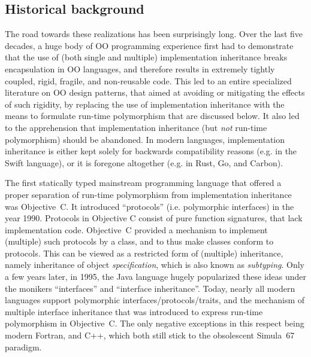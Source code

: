 \documentclass[11pt,oneside]{article}
\begin{document}
\subsection{Historical background}

The road towards these realizations has been surprisingly long. Over
the last five decades, a huge body of OO programming experience first
had to demonstrate that the use of (both single and multiple)
implementation inheritance breaks encapsulation in OO languages, and
therefore results in extremely tightly coupled, rigid, fragile, and
non-reusable code. This led to an entire specialized literature on OO
design patterns, that aimed at avoiding or mitigating the effects of
such rigidity, by replacing the use of implementation inheritance with
the means to formulate run-time polymorphism that are discussed
below. It also led to the apprehension that implementation inheritance
(but \emph{not} run-time polymorphism) should be abandoned. In modern
languages, implementation inheritance is either kept solely for
backwards compatibility reasons (e.g. in the Swift language), or it is
foregone altogether (e.g. in Rust, Go, and Carbon).

The first statically typed mainstream programming language that
offered a proper separation of run-time polymorphism from
implementation inheritance was Objective~C. It introduced
``protocols'' (i.e. polymorphic interfaces) in the year
1990. Protocols in Objective C consist of pure function signatures,
that lack implementation code. Objective~C provided a mechanism to
implement (multiple) such protocols by a class, and to thus make
classes conform to protocols. This can be viewed as a restricted form
of (multiple) inheritance, namely inheritance of object
\emph{specification}, which is also known as \emph{subtyping}. Only a
few years later, in 1995, the Java language hugely popularized these
ideas under the monikers ``interfaces'' and ``interface
inheritance''. Today, nearly all modern languages support polymorphic
interfaces/protocols/traits, and the mechanism of multiple interface
inheritance that was introduced to express run-time polymorphism in
Objective~C. The only negative exceptions in this respect being modern
Fortran, and C++, which both still stick to the obsolescent Simula~67
paradigm.
\end{document}
